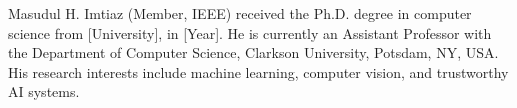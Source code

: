 \documentclass[journal]{IEEEtran}
\theoremstyle{definition}
\theoremstyle{remark}
\begin{document}
\begin{IEEEbiography}{Masudul H. Imtiaz}
(Member, IEEE) received the Ph.D. degree in computer science from [University], in [Year]. He is currently an Assistant Professor with the Department of Computer Science, Clarkson University, Potsdam, NY, USA. His research interests include machine learning, computer vision, and trustworthy AI systems.
\end{IEEEbiography}
\end{document}
